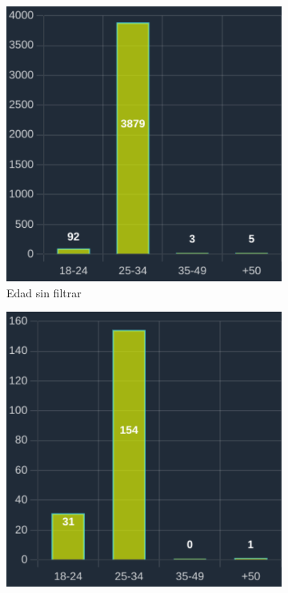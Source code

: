 \begin{figure}[H]
  \centering
  \begin{subfigure}{0.3\textwidth}
   \includegraphics[width=\textwidth]{imaxes/capturas-app/graficos/grivas/grafico-edad-grivas.png}
  \caption{Edad sin filtrar} 
  \end{subfigure}
  \begin{subfigure}{0.3\textwidth}
   \includegraphics[width=\textwidth]{imaxes/capturas-app/graficos/grivas/grafico-edad-grivas-femenino.png}

\end{subfigure}
\end{figure}
